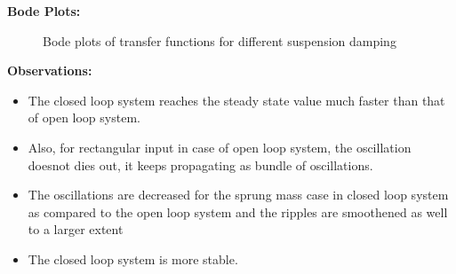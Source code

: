 \documentclass[12pt, a4paper, oneside]{report}
\begin{document}
    \textbf{Bode Plots:}
    \begin{figure}[H]
        \centering
        \hfill
        \hfill
    \end{figure}
    \begin{figure}[H]
        \centering
        \par
        \caption{Bode plots of transfer functions for different suspension damping}
        \label{fig: open_loop_bode}
    \end{figure}

    \textbf{Observations:}
    \begin{itemize}
        \item The closed loop system reaches the steady state value much faster than that of open loop system.
        \item Also, for rectangular input in case of open loop system, the oscillation doesnot dies out, it keeps propagating as bundle of oscillations.
        \item The oscillations are decreased for the sprung mass case in closed loop system as compared to the open loop system and the ripples are smoothened as well to a larger extent
        \item The closed loop system is more stable.
    \end{itemize}
\end{document}
